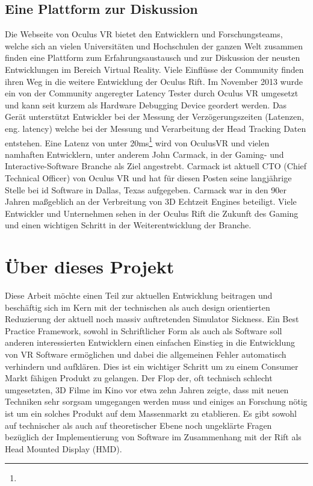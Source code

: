 \documentclass[pagesize, paper=a4, fontsize=12pt,titlepage=true, headings=small, headnosepline, abstractoff, liststotoc, nochapterprefix, plainheadsepline]{scrreprt}
\begin{document}
\subsection{Eine Plattform zur Diskussion}
Die Webseite von Oculus VR bietet den Entwicklern und Forschungsteams, welche sich an vielen Universitäten und Hochschulen der ganzen Welt zusammen finden eine Plattform zum Erfahrungsaustausch und zur Diskussion der neusten Entwicklungen im Bereich Virtual Reality. Viele Einflüsse der Community finden ihren Weg in die weitere Entwicklung der Oculus Rift. Im November 2013 wurde ein von der Community angeregter Latency Tester durch Oculus VR umgesetzt und kann seit kurzem als Hardware Debugging Device geordert werden. Das Gerät unterstützt Entwickler bei der Messung der Verzögerungszeiten (Latenzen, eng. latency) welche bei der Messung und Verarbeitung der Head Tracking Daten entstehen. Eine Latenz von unter 20ms\footnote{} wird von OculusVR und vielen namhaften Entwicklern, unter anderem John Carmack, in der Gaming- und Interactive-Software Branche als Ziel angestrebt. Carmack ist aktuell CTO (Chief Technical Officer) von Oculus VR und hat für diesen Posten seine langjährige Stelle bei id Software in Dallas, Texas aufgegeben. Carmack war in den 90er Jahren maßgeblich an der Verbreitung von 3D Echtzeit Engines beteiligt. Viele Entwickler und Unternehmen sehen in der Oculus Rift die Zukunft des Gaming und einen wichtigen Schritt in der Weiterentwicklung der Branche.


\section{Über dieses Projekt}
Diese Arbeit möchte einen Teil zur aktuellen Entwicklung beitragen und beschäftig sich im Kern mit der technischen als auch design orientierten Reduzierung der aktuell noch massiv auftretenden Simulator Sickness. Ein Best Practice Framework, sowohl in Schriftlicher Form als auch als Software soll anderen interessierten Entwicklern einen einfachen Einstieg in die Entwicklung von VR Software ermöglichen und dabei die allgemeinen Fehler automatisch verhindern und aufklären. Dies ist ein wichtiger Schritt um zu einem Consumer Markt fähigen Produkt zu gelangen. Der Flop der, oft technisch schlecht umgesetzten, 3D Filme im Kino vor etwa zehn Jahren zeigte, dass mit neuen Techniken sehr sorgsam umgegangen werden muss und einiges an Forschung nötig ist um ein solches Produkt auf dem Massenmarkt zu etablieren. Es gibt sowohl auf technischer als auch auf theoretischer Ebene noch ungeklärte Fragen bezüglich der Implementierung von Software im Zusammenhang mit der Rift als Head Mounted Display (HMD).
\end{document}

